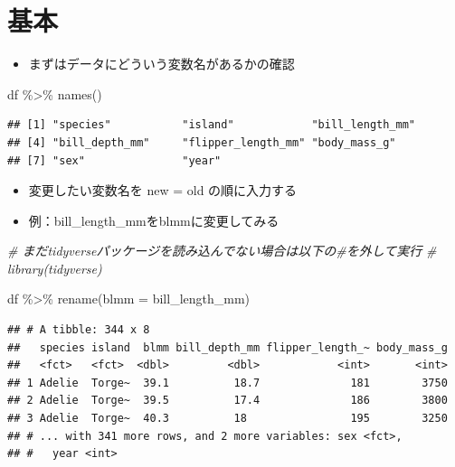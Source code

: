 \documentclass[
  xelatex,ja=standard, b5paper]{bxjsbook}
\newenvironment{Shaded}{\begin{snugshade}}{\end{snugshade}}
\newcommand{\AttributeTok}[1]{\textcolor[rgb]{0.77,0.63,0.00}{#1}}
\newcommand{\CommentTok}[1]{\textcolor[rgb]{0.56,0.35,0.01}{\textit{#1}}}
\newcommand{\FunctionTok}[1]{\textcolor[rgb]{0.00,0.00,0.00}{#1}}
\newcommand{\NormalTok}[1]{#1}
\newcommand{\SpecialCharTok}[1]{\textcolor[rgb]{0.00,0.00,0.00}{#1}}
\providecommand{\tightlist}{%
  \setlength{\itemsep}{0pt}\setlength{\parskip}{0pt}}
\begin{document}
\hypertarget{rename-standard}{%
\section{基本}\label{rename-standard}}

\begin{itemize}
\tightlist
\item
  まずはデータにどういう変数名があるかの確認
\end{itemize}

\begin{Shaded}
\begin{Highlighting}[]
\NormalTok{df }\SpecialCharTok{\%\textgreater{}\%} \FunctionTok{names}\NormalTok{()}
\end{Highlighting}
\end{Shaded}

\begin{verbatim}
## [1] "species"           "island"            "bill_length_mm"   
## [4] "bill_depth_mm"     "flipper_length_mm" "body_mass_g"      
## [7] "sex"               "year"
\end{verbatim}

\begin{itemize}
\tightlist
\item
  変更したい変数名を new = old の順に入力する
\item
  例：bill\_length\_mmをblmmに変更してみる
\end{itemize}

\begin{Shaded}
\begin{Highlighting}[]
\CommentTok{\# まだtidyverseパッケージを読み込んでない場合は以下の\#を外して実行}
\CommentTok{\# library(tidyverse)}

\NormalTok{df }\SpecialCharTok{\%\textgreater{}\%} 
  \FunctionTok{rename}\NormalTok{(}\AttributeTok{blmm =}\NormalTok{ bill\_length\_mm)}
\end{Highlighting}
\end{Shaded}

\begin{verbatim}
## # A tibble: 344 x 8
##   species island  blmm bill_depth_mm flipper_length_~ body_mass_g
##   <fct>   <fct>  <dbl>         <dbl>            <int>       <int>
## 1 Adelie  Torge~  39.1          18.7              181        3750
## 2 Adelie  Torge~  39.5          17.4              186        3800
## 3 Adelie  Torge~  40.3          18                195        3250
## # ... with 341 more rows, and 2 more variables: sex <fct>,
## #   year <int>
\end{verbatim}
\end{document}
